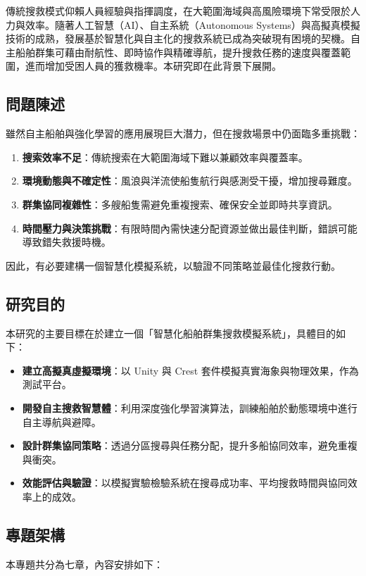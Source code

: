 \documentclass[12pt,a4paper]{article}
\begin{document}
傳統搜救模式仰賴人員經驗與指揮調度，在大範圍海域與高風險環境下常受限於人力與效率。隨著人工智慧（AI）、自主系統（Autonomous Systems）與高擬真模擬技術的成熟，發展基於智慧化與自主化的搜救系統已成為突破現有困境的契機。自主船舶群集可藉由耐航性、即時協作與精確導航，提升搜救任務的速度與覆蓋範圍，進而增加受困人員的獲救機率。本研究即在此背景下展開。

\subsection{問題陳述}
雖然自主船舶與強化學習的應用展現巨大潛力，但在搜救場景中仍面臨多重挑戰：

\begin{enumerate}
\item \textbf{搜索效率不足}：傳統搜索在大範圍海域下難以兼顧效率與覆蓋率。
\item \textbf{環境動態與不確定性}：風浪與洋流使船隻航行與感測受干擾，增加搜尋難度。
\item \textbf{群集協同複雜性}：多艘船隻需避免重複搜索、確保安全並即時共享資訊。
\item \textbf{時間壓力與決策挑戰}：有限時間內需快速分配資源並做出最佳判斷，錯誤可能導致錯失救援時機。
\end{enumerate}

因此，有必要建構一個智慧化模擬系統，以驗證不同策略並最佳化搜救行動。

\subsection{研究目的}
本研究的主要目標在於建立一個「智慧化船舶群集搜救模擬系統」，具體目的如下：

\begin{itemize}
\item \textbf{建立高擬真虛擬環境}：以 Unity 與 Crest 套件模擬真實海象與物理效果，作為測試平台。
\item \textbf{開發自主搜救智慧體}：利用深度強化學習演算法，訓練船舶於動態環境中進行自主導航與避障。
\item \textbf{設計群集協同策略}：透過分區搜尋與任務分配，提升多船協同效率，避免重複與衝突。
\item \textbf{效能評估與驗證}：以模擬實驗檢驗系統在搜尋成功率、平均搜救時間與協同效率上的成效。
\end{itemize}

\subsection{專題架構}
本專題共分為七章，內容安排如下：
\end{document}
